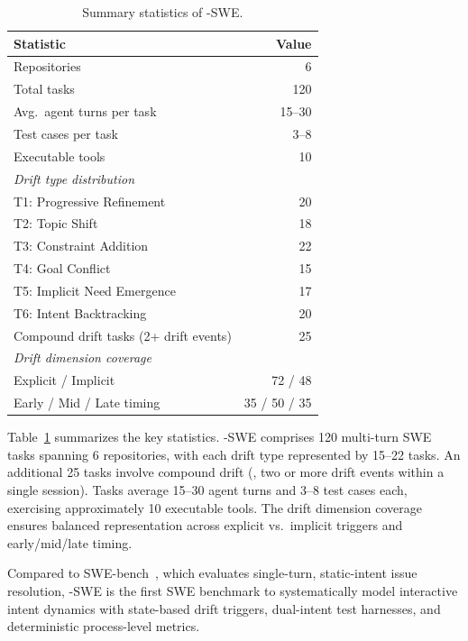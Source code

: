 \begin{table}[t]
\centering
\small
\caption{Summary statistics of \bench{}-SWE.}
\label{tab:bench-stats}
\begin{tabular}{lr}
\toprule
\textbf{Statistic} & \textbf{Value} \\
\midrule
Repositories & 6 \\
Total tasks & 120 \\
Avg.\ agent turns per task & 15--30 \\
Test cases per task & 3--8 \\
Executable tools & 10 \\
\midrule
\multicolumn{2}{l}{\textit{Drift type distribution}} \\
\quad T1: Progressive Refinement & 20 \\
\quad T2: Topic Shift & 18 \\
\quad T3: Constraint Addition & 22 \\
\quad T4: Goal Conflict & 15 \\
\quad T5: Implicit Need Emergence & 17 \\
\quad T6: Intent Backtracking & 20 \\
\midrule
Compound drift tasks (2+ drift events) & 25 \\
\midrule
\multicolumn{2}{l}{\textit{Drift dimension coverage}} \\
\quad Explicit / Implicit & 72 / 48 \\
\quad Early / Mid / Late timing & 35 / 50 / 35 \\
\bottomrule
\end{tabular}
\end{table}

Table~\ref{tab:bench-stats} summarizes the key statistics. \bench{}-SWE comprises 120 multi-turn SWE tasks spanning 6 repositories, with each drift type represented by 15--22 tasks. An additional 25 tasks involve compound drift (\ie, two or more drift events within a single session). Tasks average 15--30 agent turns and 3--8 test cases each, exercising approximately 10 executable tools. The drift dimension coverage ensures balanced representation across explicit vs.\ implicit triggers and early/mid/late timing.

Compared to SWE-bench~\citep{jimenez2024swebench}, which evaluates single-turn, static-intent issue resolution, \bench{}-SWE is the first SWE benchmark to systematically model interactive intent dynamics with state-based drift triggers, dual-intent test harnesses, and deterministic process-level metrics.

